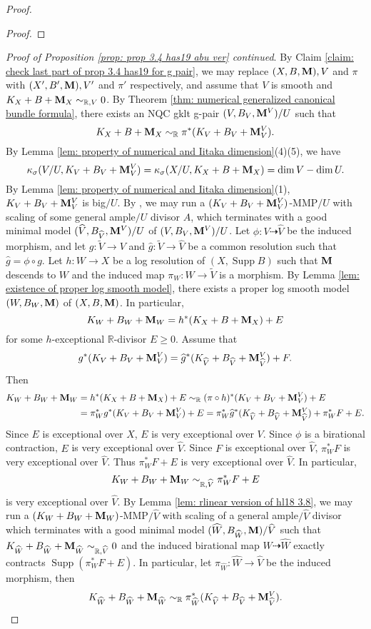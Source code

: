 \documentclass[11pt]{amsart}
\numberwithin{equation}{section}
\newcommand{\Mm}{{\bf{M}}}
\newcommand{\Rr}{\mathbb{R}}
\newcommand{\Supp}{\operatorname{Supp}}
\theoremstyle{definition}
\theoremstyle{definition}
\theoremstyle{definition}
\begin{document}
\begin{proof}
\begin{proof}
\end{proof}
\noindent\textit{Proof of Proposition \ref{prop: prop 3.4 has19 abu ver} continued}. By Claim \ref{claim: check last part of prop 3.4 has19 for g pair}, we may replace $(X,B,\Mm),V$ and $\pi$ with $(X',B',\Mm),V'$ and $\pi'$ respectively, and assume that $V$ is smooth and $K_X+B+\Mm_X\sim_{\mathbb R,V}0$. By Theorem \ref{thm: numerical generalized canonical bundle formula}, there exists an NQC gklt g-pair $(V,B_V,\Mm^V)/U$ such that 
$$K_X+B+\Mm_X\sim_{\mathbb R}\pi^*(K_V+B_V+\Mm^V_V).$$
By Lemma \ref{lem: property of numerical and Iitaka dimension}(4)(5), we have
$$\kappa_{\sigma}(V/U,K_V+B_V+\Mm^V_V)=\kappa_{\sigma}(X/U,K_X+B+\Mm_X)=\dim V-\dim U.$$
By Lemma \ref{lem: property of numerical and Iitaka dimension}(1), $K_V+B_V+\Mm^V_V$ is big$/U$. By \cite[Lemma 4.4(2)]{BZ16}, we may run a $(K_V+B_V+\Mm^V_V)$-MMP$/U$ with scaling of some general ample$/U$ divisor $A$, which terminates with a good minimal model $(\widehat V,B_{\widehat V},\Mm^V)/U$ of $(V,B_V,\Mm^V)/U$. Let $\phi: V\dashrightarrow\widehat V$ be the induced morphism, and let $g: \tilde V\rightarrow V$ and $\widehat g: \tilde V\rightarrow\widehat V$ be a common resolution such that $\widehat g=\phi\circ g$. Let $h: W\rightarrow X$ be a log resolution of $(X,\Supp B)$ such that $\Mm$ descends to $W$ and the induced map $\pi_W: W\rightarrow\tilde V$ is a morphism. By Lemma \ref{lem: existence of proper log smooth model}, there exists a proper log smooth model $(W,B_W,\Mm)$ of $(X,B,\Mm)$. In particular,
$$K_W+B_W+\Mm_W=h^*(K_X+B+\Mm_X)+E$$
for some $h$-exceptional $\Rr$-divisor $E\geq 0$. Assume that
$$g^*(K_V+B_V+\Mm^V_V)=\widehat g^*(K_{\widehat V}+B_{\widehat V}+\Mm^V_{\widehat V})+F.$$
Then
\begin{align*}
    K_W+B_W+\Mm_W&=h^*(K_X+B+\Mm_X)+E\sim_{\mathbb R}(\pi\circ h)^*(K_V+B_V+\Mm^V_V)+E\\
    &=\pi_W^*g^*(K_V+B_V+\Mm^V_V)+E=\pi_W^*\widehat g^*(K_{\widehat V}+B_{\widehat V}+\Mm^V_{\widehat V})+\pi_W^*F+E.
\end{align*}
Since $E$ is exceptional over $X$, $E$ is very exceptional over $V$. Since $\phi$ is a birational contraction, $E$ is very exceptional over $\widehat V$. Since $F$ is exceptional over $\widehat V$, $\pi_W^*F$ is very exceptional over $\widehat V$. Thus $\pi_W^*F+E$ is very exceptional over $\widehat V$. In particular, $$K_W+B_W+\Mm_W\sim_{\mathbb R,\widehat V}\pi_W^*F+E$$
is very exceptional over $\widehat V$. By Lemma \ref{lem: rlinear version of hl18 3.8}, we may run a $(K_W+B_W+\Mm_W)$-MMP$/\widehat V$ with scaling of a general ample$/\widehat V$ divisor which terminates with a good minimal model $(\widehat W,B_{\widehat W},\Mm)/\widehat V$ such that $K_{\widehat W}+B_{\widehat W}+\Mm_{\widehat W}\sim_{\Rr,\widehat V}0$ and the induced birational map $W\dashrightarrow\widehat W$ exactly contracts $\Supp(\pi_W^*F+E)$. In particular, let $\pi_{\widehat W}: \widehat W\rightarrow\widehat  V$ be the induced morphism, then $$K_{\widehat W}+B_{\widehat W}+\Mm_{\widehat W}\sim_{\Rr}\pi_{\widehat W}^*(K_{\widehat V}+B_{\widehat V}+\Mm^V_{\widehat V}).$$

\end{proof}
\end{document}

